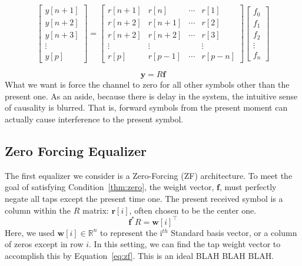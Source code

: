 \documentclass[]{article}
\begin{document}
\begin{equation}
\label{eq:equalizerVector}
\left[ \begin{array}{c}
 y \left[n+1\right] \\
 y \left[n+2\right] \\
 y \left[n+3\right] \\
\vdots  \\
y\left[ p \right] \end{array} \right] = 
\begin{bmatrix} 
r \left[ n+1\right]  & r[n] & \cdots & r\left[ 1 \right] \\ 
r \left[ n+2\right]  & r[n+1] & \cdots & r\left[ 2 \right] \\ 
r \left[ n+2\right]  & r[n+2] & \cdots & r\left[ 3 \right] \\ 
\vdots & \vdots & & \vdots \\
r \left[p \right] & r\left[ p-1 \right] & \cdots & r\left[ p-n \right]
\end{bmatrix}
 \left[ \begin{array}{c} f_0 \\ f_1 \\ f_2 \\ \vdots \\ f_n \end{array} \right]
\end{equation}

\begin{equation}
\label{eq:equalizerMatrix}
\mathbf{y} = R\mathbf{f}
\end{equation}
What we want is force the channel to zero for all other symbols other than the present one.  As an aside, because there is delay in the system, the intuitive sense of causality is blurred. That is, forward symbols from the present moment can actually cause interference to the present symbol.   \\

\subsection{Zero Forcing Equalizer}
\label{sec:zf}
The first equalizer we consider is a Zero-Forcing (ZF) architecture.  To meet the goal of satisfying Condition~\ref{thm:zero}, the weight vector, $\mathbf{f}$, must perfectly negate all taps except the present time one.  The present received symbol is a column within the $R$ matrix: $\mathbf{r}[i]$, often chosen to be the center one.  
$$ \mathbf{f}^{\ast}R = \mathbf{w}[i]^{\top} $$
Here, we used  $\mathbf{w} [i] \in \mathbb{R}^n$ to represent the i$^{th}$ Standard basis vector, or a column of zeros except in row $i$.  In this setting, we can find the tap weight vector to accomplish this by Equation~\ref{eq:zf}.  This is an ideal BLAH BLAH BLAH.
\end{document}
